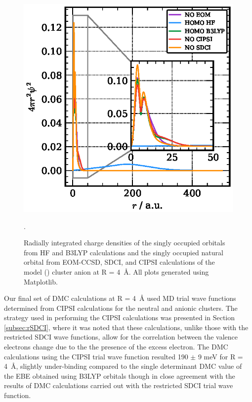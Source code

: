 \begin{figure}
    \includegraphics[width=\columnwidth,keepaspectratio]{Images/chapter3/r4_orbitalr2.eps}
    \caption{\label{fig:orbitalsR4} Radially integrated charge densities of the singly occupied orbitals from HF and B3LYP calculations and the singly occupied natural orbital from EOM-CCSD, SDCI, and CIPSI calculations  of the model () cluster anion at R = \SI{4}{\angstrom}. All plots generated using Matplotlib.\cite{10.1109/MCSE.2007.55}}.
\end{figure}


Our final set of DMC calculations at R = \SI{4}{\angstrom} used MD trial wave functions determined from CIPSI calculations for the neutral and anionic clusters. 
The strategy used in performing the CIPSI calculations was presented in Section \ref{subsec:rSDCI}, where it was noted that these calculations, unlike those with the restricted SDCI wave functions, allow for the correlation between the valence electrons change due to the the presence of the excess electron. 
The DMC calculations using the CIPSI trial wave function resulted 190 $\pm$ 9 meV for R = \SI{4}{\angstrom}, slightly under-binding compared to the single determinant DMC value of the EBE obtained using B3LYP orbitals though in close agreement with the results of DMC calculations carried out with the restricted SDCI trial wave function.

